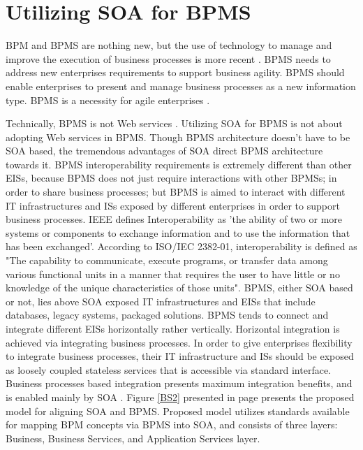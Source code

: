 \documentclass[12pt,a4paper,final,twoside,onecolumn,titlepage]{book}
\begin{document}
\section{Utilizing SOA for BPMS}
\gls{BPM} and \gls{BPMS} are nothing new, but the use of technology to manage and improve the execution of business processes is more recent \cite{BS04}. \gls{BPMS} needs to address new enterprises requirements to support business agility. \gls{BPMS} should enable enterprises to present and manage business processes as a new information type. \gls{BPMS} is a necessity for agile enterprises \cite{BS19}.

Technically, \gls{BPMS} is not Web services \cite{BS24}. Utilizing \gls{SOA} for \gls{BPMS} is not about adopting Web services in \gls{BPMS}. Though \gls{BPMS} architecture doesn't have to be \gls{SOA} based, the tremendous advantages of \gls{SOA} direct \gls{BPMS} architecture towards it. \gls{BPMS} interoperability requirements is extremely different than other \gls{EIS}s, because \gls{BPMS} does not just require interactions with other BPMSs; in order to share business processes; but \gls{BPMS} is aimed to interact with different IT infrastructures and \gls{IS}s exposed by different enterprises in order to support business processes.  IEEE defines Interoperability as 'the ability of two or more systems or components to exchange information and to use the information that has been exchanged'. According to \gls{ISO/IEC} 2382-01, interoperability is defined as "The capability to communicate, execute programs, or transfer data among various functional units in a manner that requires the user to have little or no knowledge of the unique characteristics of those units". \gls{BPMS}, either \gls{SOA} based or not, lies above \gls{SOA} exposed IT infrastructures and \gls{EIS}s that include databases, legacy systems, packaged solutions. \gls{BPMS} tends to connect and integrate different \gls{EIS}s horizontally rather vertically. Horizontal integration is achieved via integrating business processes. In order to give enterprises flexibility to integrate business processes, their IT infrastructure and \gls{IS}s should be exposed as loosely coupled stateless services that is accessible via standard interface. Business processes based integration presents maximum integration benefits, and is enabled mainly by \gls{SOA} \cite{EV09}.
Figure \ref{BS2} presented in page \pageref{BS2} presents the proposed model for aligning \gls{SOA} and \gls{BPMS}. Proposed model utilizes standards available for mapping \gls{BPM} concepts via \gls{BPMS} into \gls{SOA}, and consists of three layers: Business, Business Services, and Application Services layer. 
\end{document}

